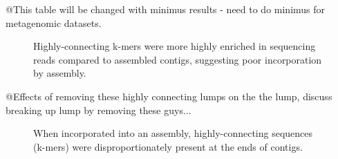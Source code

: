 \documentclass[11pt]{article} %
\begin{document}
@This table will be changed with minimus results - need to do minimus for metagenomic datasets.

\begin{figure}
\caption{Highly-connecting k-mers were more highly enriched in sequencing reads compared to assembled contigs, suggesting poor incorporation by assembly.}
\end{figure}

@Effects of removing these highly connecting lumps on the the lump, discuss breaking up lump by removing these guys...

\begin{figure}
\caption{When incorporated into an assembly, highly-connecting sequences (k-mers) were disproportionately present at the ends of contigs.}
\end{figure}
\end{document}
